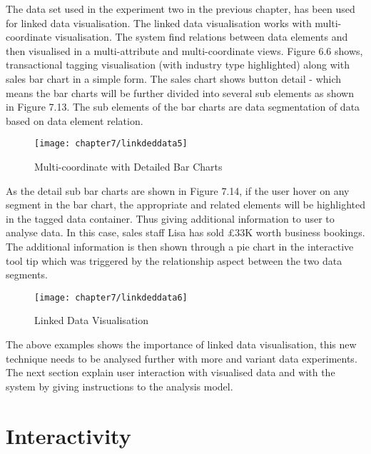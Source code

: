 The data set used in the experiment two in the previous chapter, has been used for linked data visualisation. The linked data visualisation works with multi-coordinate visualisation. The system find relations between data elements and then visualised in a multi-attribute and multi-coordinate views. Figure 6.6 shows, transactional tagging visualisation (with industry type highlighted) along with sales bar chart in a simple form. The sales chart shows button detail - which means the bar charts will be further divided into several sub elements as shown in Figure 7.13. The sub elements of the bar charts are data segmentation of data based on data element relation.

\begin{figure}[H]
\centering
\texttt{[image: chapter7/linkdeddata5]}
\caption{Multi-coordinate with Detailed Bar Charts}
\end{figure}

As the detail sub bar charts are shown in Figure 7.14, if the user hover on any segment in the bar chart, the appropriate and related elements will be highlighted in the tagged data container. Thus giving additional information to user to analyse data. In this case, sales staff Lisa has sold £33K worth business bookings. The additional information is then shown through a pie chart in the interactive tool tip which was triggered by the relationship aspect between the two data segments.

\begin{figure}[H]
\centering
\texttt{[image: chapter7/linkdeddata6]}
\caption{Linked Data Visualisation}
\end{figure}

The above examples shows the importance of linked data visualisation, this new technique needs to be analysed further with more and variant data experiments. The next section explain user interaction with visualised data and with the system by giving instructions to the analysis model.

\section{Interactivity}

